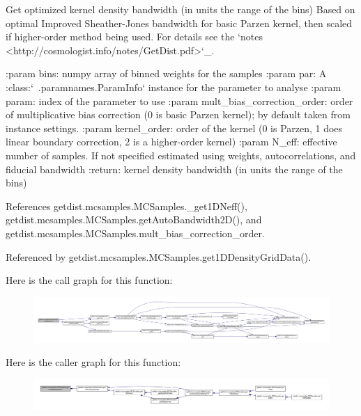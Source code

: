 \begin{DoxyVerb}Get optimized kernel density bandwidth (in units the range of the bins)
Based on optimal Improved Sheather-Jones bandwidth for basic Parzen kernel, then scaled if higher-order method being used.
For details see the `notes <http://cosmologist.info/notes/GetDist.pdf>`_.

:param bins: numpy array of binned weights for the samples
:param par: A :class:`~.paramnames.ParamInfo` instance for the parameter to analyse
:param param: index of the parameter to use
:param mult_bias_correction_order: order of multiplicative bias correction (0 is basic Parzen kernel); by default taken from instance settings.
:param kernel_order: order of the kernel (0 is Parzen, 1 does linear boundary correction, 2 is a higher-order kernel) 
:param N_eff: effective number of samples. If not specified estimated using weights, autocorrelations, and fiducial bandwidth
:return: kernel density bandwidth (in units the range of the bins)
\end{DoxyVerb}
 

References getdist.\+mcsamples.\+M\+C\+Samples.\+\_\+get1\+D\+Neff(), getdist.\+mcsamples.\+M\+C\+Samples.\+get\+Auto\+Bandwidth2\+D(), and getdist.\+mcsamples.\+M\+C\+Samples.\+mult\+\_\+bias\+\_\+correction\+\_\+order.



Referenced by getdist.\+mcsamples.\+M\+C\+Samples.\+get1\+D\+Density\+Grid\+Data().

Here is the call graph for this function\+:
\nopagebreak
\begin{figure}[H]
\begin{center}
\leavevmode
\includegraphics[width=350pt]{classgetdist_1_1mcsamples_1_1MCSamples_a0e632352cb52bb4c05cb060427fcb0bc_cgraph}
\end{center}
\end{figure}
Here is the caller graph for this function\+:
\nopagebreak
\begin{figure}[H]
\begin{center}
\leavevmode
\includegraphics[width=350pt]{classgetdist_1_1mcsamples_1_1MCSamples_a0e632352cb52bb4c05cb060427fcb0bc_icgraph}
\end{center}
\end{figure}
\mbox{\label{classgetdist_1_1mcsamples_1_1MCSamples_a3445486ce2813000c1306234fb2dd6f3}} 
